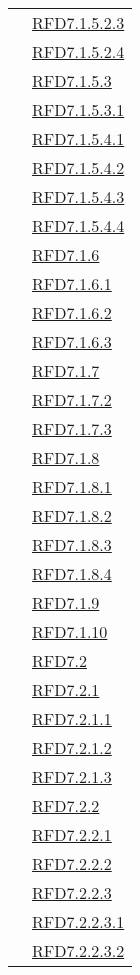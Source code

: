 \begin{longtable}{|>{\centering}m{5cm}|m{5cm}<{\centering}|}
& \hyperlink{RFD7.1.5.2.3}{RFD7.1.5.2.3}\\
& \hyperlink{RFD7.1.5.2.4}{RFD7.1.5.2.4}\\
& \hyperlink{RFD7.1.5.3}{RFD7.1.5.3}\\
& \hyperlink{RFD7.1.5.3.1}{RFD7.1.5.3.1}\\
& \hyperlink{RFD7.1.5.4.1}{RFD7.1.5.4.1}\\
& \hyperlink{RFD7.1.5.4.2}{RFD7.1.5.4.2}\\
& \hyperlink{RFD7.1.5.4.3}{RFD7.1.5.4.3}\\
& \hyperlink{RFD7.1.5.4.4}{RFD7.1.5.4.4}\\
& \hyperlink{RFD7.1.6}{RFD7.1.6}\\
& \hyperlink{RFD7.1.6.1}{RFD7.1.6.1}\\
& \hyperlink{RFD7.1.6.2}{RFD7.1.6.2}\\
& \hyperlink{RFD7.1.6.3}{RFD7.1.6.3}\\
& \hyperlink{RFD7.1.7}{RFD7.1.7}\\
& \hyperlink{RFD7.1.7.2}{RFD7.1.7.2}\\
& \hyperlink{RFD7.1.7.3}{RFD7.1.7.3}\\
& \hyperlink{RFD7.1.8}{RFD7.1.8}\\
& \hyperlink{RFD7.1.8.1}{RFD7.1.8.1}\\
& \hyperlink{RFD7.1.8.2}{RFD7.1.8.2}\\
& \hyperlink{RFD7.1.8.3}{RFD7.1.8.3}\\
& \hyperlink{RFD7.1.8.4}{RFD7.1.8.4}\\
& \hyperlink{RFD7.1.9}{RFD7.1.9}\\
& \hyperlink{RFD7.1.10}{RFD7.1.10}\\
& \hyperlink{RFD7.2}{RFD7.2}\\
& \hyperlink{RFD7.2.1}{RFD7.2.1}\\
& \hyperlink{RFD7.2.1.1}{RFD7.2.1.1}\\
& \hyperlink{RFD7.2.1.2}{RFD7.2.1.2}\\
& \hyperlink{RFD7.2.1.3}{RFD7.2.1.3}\\
& \hyperlink{RFD7.2.2}{RFD7.2.2}\\
& \hyperlink{RFD7.2.2.1}{RFD7.2.2.1}\\
& \hyperlink{RFD7.2.2.2}{RFD7.2.2.2}\\
& \hyperlink{RFD7.2.2.3}{RFD7.2.2.3}\\
& \hyperlink{RFD7.2.2.3.1}{RFD7.2.2.3.1}\\
& \hyperlink{RFD7.2.2.3.2}{RFD7.2.2.3.2}\\

\end{longtable}
